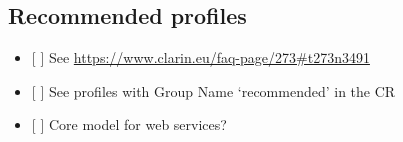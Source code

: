 \subsection{Recommended profiles}\label{recommended-profiles}

\begin{itemize}
\tightlist
\item
  {[} {]} See \url{https://www.clarin.eu/faq-page/273\#t273n3491}
\item
  {[} {]} See profiles with Group Name `recommended' in the CR
\item
  {[} {]} Core model for web services?
\end{itemize}
